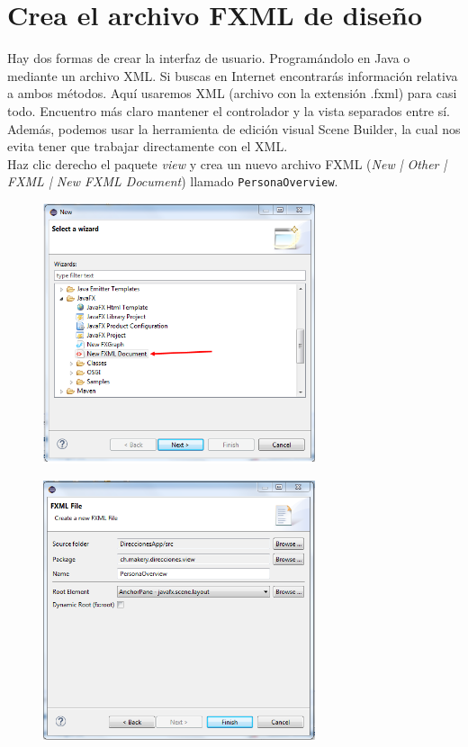 \section{Crea el archivo FXML de diseño}
Hay dos formas de crear la interfaz de usuario. Programándolo en Java o mediante un archivo XML. Si buscas en Internet encontrarás información relativa a ambos métodos. Aquí usaremos XML (archivo con la extensión .fxml) para casi todo. Encuentro más claro mantener el controlador y la vista separados entre sí. Además, podemos usar la herramienta de edición visual Scene Builder, la cual nos evita tener que trabajar directamente con el XML.\\
Haz clic derecho el paquete \textit{view} y crea un nuevo archivo FXML (\textit{New | Other | FXML | New FXML Document}) llamado \textcolor{codigo}{\texttt{PersonaOverview}}.
\begin{figure}[H]
	\includegraphics[width=8cm]{img/fxmlDocument}
\end{figure}
\begin{figure}[H]
	\includegraphics[width=8cm]{img/fxmlNombreDocument}
\end{figure}

